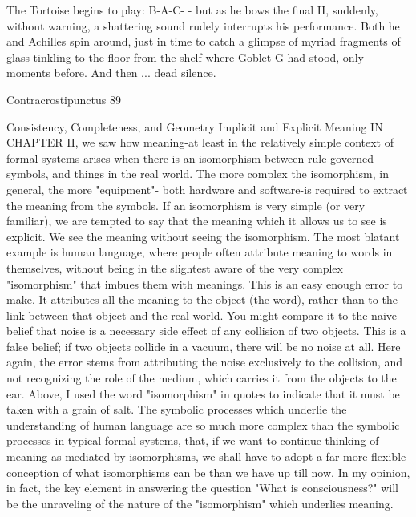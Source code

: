       The Tortoise begins to play: B-A-C- - but as he bows the final H, suddenly,
      without warning, a shattering sound rudely interrupts his performance. Both
      he and Achilles spin around, just in time to catch a glimpse of myriad
      fragments of glass tinkling to the floor from the shelf where Goblet G had
      stood, only moments before. And then ... dead silence.




Contracrostipunctus                                                                      89


                     Consistency, Completeness,
                           and Geometry
                           Implicit and Explicit Meaning
IN CHAPTER II, we saw how meaning-at least in the relatively simple context of formal
systems-arises when there is an isomorphism between rule-governed symbols, and things
in the real world. The more complex the isomorphism, in general, the more "equipment"-
both hardware and software-is required to extract the meaning from the symbols. If an
isomorphism is very simple (or very familiar), we are tempted to say that the meaning
which it allows us to see is explicit. We see the meaning without seeing the isomorphism.
The most blatant example is human language, where people often attribute meaning to
words in themselves, without being in the slightest aware of the very complex
"isomorphism" that imbues them with meanings. This is an easy enough error to make. It
attributes all the meaning to the object (the word), rather than to the link between that
object and the real world. You might compare it to the naive belief that noise is a
necessary side effect of any collision of two objects. This is a false belief; if two objects
collide in a vacuum, there will be no noise at all. Here again, the error stems from
attributing the noise exclusively to the collision, and not recognizing the role of the
medium, which carries it from the objects to the ear.
        Above, I used the word "isomorphism" in quotes to indicate that it must be taken
with a grain of salt. The symbolic processes which underlie the understanding of human
language are so much more complex than the symbolic processes in typical formal
systems, that, if we want to continue thinking of meaning as mediated by isomorphisms,
we shall have to adopt a far more flexible conception of what isomorphisms can be than
we have up till now. In my opinion, in fact, the key element in answering the question
"What is consciousness?" will be the unraveling of the nature of the "isomorphism"
which underlies meaning.

